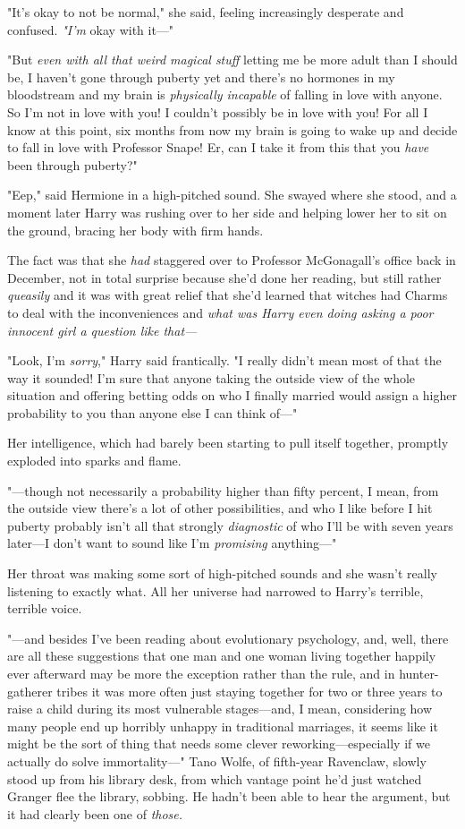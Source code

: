 "It's okay to not be normal," she said, feeling increasingly desperate and 
confused. \emph{"I'm} okay with it---"

"But \emph{even with all that weird magical stuff} letting me be more adult 
than I should be, I haven't gone through puberty yet and there's no hormones in 
my bloodstream and my brain is \emph{physically incapable} of falling in love 
with anyone. So I'm not in love with you! I couldn't possibly be in love with 
you! For all I know at this point, six months from now my brain is going to 
wake up and decide to fall in love with Professor Snape! Er, can I take it from 
this that you \emph{have} been through puberty?"

"Eep," said Hermione in a high-pitched sound. She swayed where she stood, and a 
moment later Harry was rushing over to her side and helping lower her to sit on 
the ground, bracing her body with firm hands.

The fact was that she \emph{had} staggered over to Professor McGonagall's 
office back in December, not in total surprise because she'd done her reading, 
but still rather \emph{queasily} and it was with great relief that she'd 
learned that witches had Charms to deal with the inconveniences and \emph{what 
was Harry even doing asking a poor innocent girl a question like that---}

"Look, I'm \emph{sorry}," Harry said frantically. "I really didn't mean most of 
that the way it sounded! I'm sure that anyone taking the outside view of the 
whole situation and offering betting odds on who I finally married would assign 
a higher probability to you than anyone else I can think of---"

Her intelligence, which had barely been starting to pull itself together, 
promptly exploded into sparks and flame.

"---though not necessarily a probability higher than fifty percent, I mean, 
from the outside view there's a lot of other possibilities, and who I like 
before I hit puberty probably isn't all that strongly \emph{diagnostic} of who 
I'll be with seven years later---I don't want to sound like I'm 
\emph{promising} anything---"

Her throat was making some sort of high-pitched sounds and she wasn't really 
listening to exactly what. All her universe had narrowed to Harry's terrible, 
terrible voice.

"---and besides I've been reading about evolutionary psychology, and, well, 
there are all these suggestions that one man and one woman living together 
happily ever afterward may be more the exception rather than the rule, and in 
hunter-gatherer tribes it was more often just staying together for two or three 
years to raise a child during its most vulnerable stages---and, I mean, 
considering how many people end up horribly unhappy in traditional marriages, 
it seems like it might be the sort of thing that needs some clever 
reworking---especially if we actually do solve immortality---"
\sbreak
Tano Wolfe, of fifth-year Ravenclaw, slowly stood up from his library desk, 
from which vantage point he'd just watched Granger flee the library, sobbing. 
He hadn't been able to hear the argument, but it had clearly been one of 
\emph{those.}

